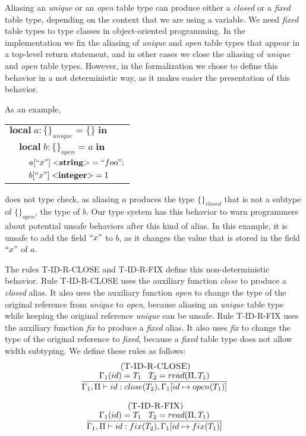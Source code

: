 \documentclass{sigplanconf}
\newcommand{\Integer}{\mathbf{integer}}
\newcommand{\String}{\mathbf{string}}
\newcommand{\mylabel}[1]{\; (\textsc{#1})}
\newcommand{\env}{\Gamma}
\newcommand{\penv}{\Pi}
\begin{document}
Aliasing an \emph{unique} or an \emph{open} table type can produce
either a \emph{closed} or a \emph{fixed} table type, depending on
the context that we are using a variable.
We need \emph{fixed} table types to type classes in object-oriented programming.
In the implementation we fix the aliasing of \emph{unique} and \emph{open}
table types that appear in a top-level return statement, and in other cases we
close the aliasing of \emph{unique} and \emph{open} table types.
However, in the formalization we chose to define this behavior in
a not deterministic way, as it makes easier the presentation of this behavior.

As an example,
\begin{center}
\begin{tabular}{lll}
\multicolumn{3}{l}{$\mathbf{local} \; a:\{\}_{unique} = \{\} \; \mathbf{in}$}\\
& \multicolumn{2}{l}{$\mathbf{local} \; b:\{\}_{open} = a \; \mathbf{in}$}\\
& & \multicolumn{1}{l}{$a[``x"] \; {<}\String{>} = ``foo";$}\\
& & \multicolumn{1}{l}{$b[``x"] \; {<}\Integer{>} = 1$}\\
\end{tabular}
\end{center}
does not type check, as aliasing $a$ produces the type $\{\}_{closed}$
that is not a subtype of $\{\}_{open}$, the type of $b$.
Our type system has this behavior to warn programmers about
potential unsafe behaviors after this kind of alias.
In this example, it is unsafe to add the field $``x"$ to $b$,
as it changes the value that is stored in the field $``x"$ of $a$.

The rules \textsc{T-ID-R-CLOSE} and \textsc{T-ID-R-FIX} define this non-deterministic behavior.
Rule \textsc{T-ID-R-CLOSE} uses the auxiliary function \emph{close} to
produce a \emph{closed} alias.
It also uses the auxiliary function \emph{open} to change the type of
the original reference from \emph{unique} to \emph{open},
because aliasing an \emph{unique} table type while keeping the original
reference \emph{unique} can be unsafe.
Rule \textsc{T-ID-R-FIX} uses the auxiliary function \emph{fix} to
produce a \emph{fixed} alias.
It also uses \emph{fix} to change the type of the original reference
to \emph{fixed}, because a \emph{fixed} table type does not allow
width subtyping.
We define these rules as follows:
\[
\begin{array}{c}
\begin{array}{c}
\mylabel{T-ID-R-CLOSE}\\
\dfrac{\env_{1}(id) = T_{1} \;\;\; T_{2} = read(\penv, T_{1})}
      {\env_{1}, \penv \vdash id:close(T_{2}), \env_{1}[id \mapsto open(T_{1})]}
\end{array}
\\ \\
\begin{array}{c}
\mylabel{T-ID-R-FIX}\\
\dfrac{\env_{1}(id) = T_{1} \;\;\; T_{2} = read(\penv, T_{1})}
      {\env_{1}, \penv \vdash id:fix(T_{2}), \env_{1}[id \mapsto fix(T_{1})]}
\end{array}
\end{array}
\]
\end{document}

